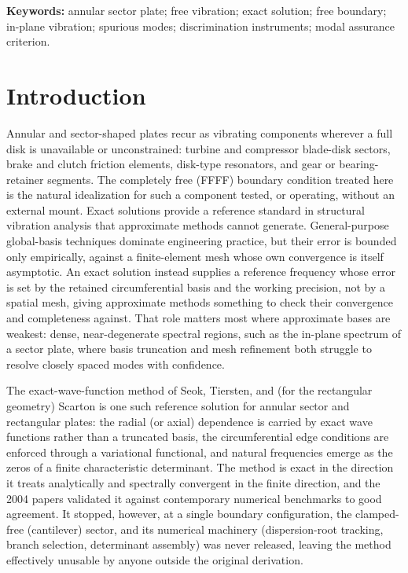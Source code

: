 \documentclass[11pt]{article}
\begin{document}
\noindent\textbf{Keywords:} annular sector plate; free vibration; exact
solution; free boundary; in-plane vibration; spurious modes;
discrimination instruments; modal assurance criterion.

\section{Introduction}
Annular and sector-shaped plates recur as vibrating components wherever a
full disk is unavailable or unconstrained: turbine and compressor
blade-disk sectors, brake and clutch friction elements, disk-type
resonators, and gear or bearing-retainer segments. The completely free
(FFFF) boundary condition treated here is the natural idealization for
such a component tested, or operating, without an external mount.
Exact solutions provide a reference standard in structural vibration
analysis that approximate methods cannot generate.
General-purpose global-basis techniques dominate engineering practice, but
their error is bounded only empirically, against a finite-element mesh
whose own convergence is itself asymptotic. An exact solution instead
supplies a reference frequency whose error is set by the retained
circumferential basis and the working precision, not by a spatial mesh,
giving approximate methods something to check their
convergence and completeness against. That role matters most where
approximate bases are weakest: dense, near-degenerate spectral regions,
such as the in-plane spectrum of a sector plate, where basis truncation
and mesh refinement both struggle to resolve closely spaced modes with
confidence.

The exact-wave-function method of Seok, Tiersten, and (for the rectangular
geometry) Scarton \cite{seok1,seok2,seok3,seok4} is one such reference
solution for annular sector and rectangular plates: the radial (or axial)
dependence is carried by
exact wave functions rather than a truncated basis, the circumferential
edge conditions are enforced through a variational functional, and natural
frequencies emerge as the zeros of a finite characteristic determinant. The
method is exact in the direction it treats analytically and spectrally
convergent in the finite direction, and the 2004 papers validated it
against contemporary numerical benchmarks to good agreement. It stopped,
however, at a single boundary configuration, the clamped-free
(cantilever) sector, and its numerical machinery (dispersion-root
tracking, branch selection, determinant assembly) was never released,
leaving the method effectively unusable by anyone outside the original
derivation.
\end{document}
